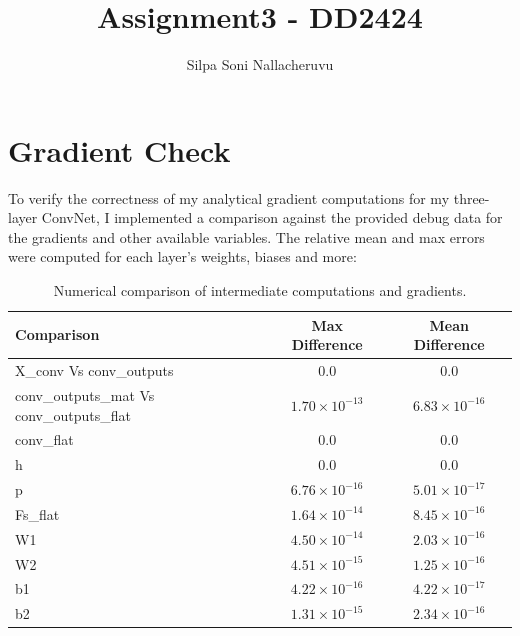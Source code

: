 \documentclass[11pt]{article}
\begin{document}
\title{Assignment3 - DD2424}
\author{Silpa Soni Nallacheruvu}
\date{}
\maketitle

\section*{Gradient Check}

To verify the correctness of my analytical gradient computations for my three-layer ConvNet, I implemented a comparison against the provided debug data for the gradients and other available variables. The relative mean and max errors were computed for each layer's weights, biases and more:
\begin{table}[h!]
  \centering
  \begin{tabular}{|l|c|c|}
  \hline
  \textbf{Comparison} & \textbf{Max Difference} & \textbf{Mean Difference} \\
  \hline
  X\_conv Vs conv\_outputs           & $0.0$                        & $0.0$ \\
  conv\_outputs\_mat Vs conv\_outputs\_flat & $1.70 \times 10^{-13}$       & $6.83 \times 10^{-16}$ \\
  conv\_flat                         & $0.0$                        & $0.0$  \\
  h                                  & $0.0$                        & $0.0$  \\
  p                                  & $6.76 \times 10^{-16}$       & $5.01 \times 10^{-17}$ \\
  Fs\_flat                           & $1.64 \times 10^{-14}$       & $8.45 \times 10^{-16}$ \\
  W1                                 & $4.50 \times 10^{-14}$       & $2.03 \times 10^{-16}$ \\
  W2                                 & $4.51 \times 10^{-15}$       & $1.25 \times 10^{-16}$ \\
  b1                                 & $4.22 \times 10^{-16}$       & $4.22 \times 10^{-17}$ \\
  b2                                 & $1.31 \times 10^{-15}$       & $2.34 \times 10^{-16}$ \\
  \hline
  \end{tabular}
  \caption{Numerical comparison of intermediate computations and gradients.}
  \end{table}
\end{document}
